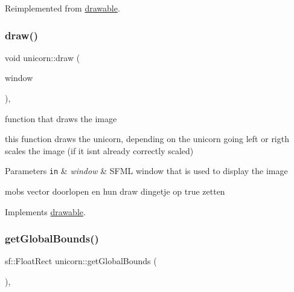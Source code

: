 Reimplemented from \hyperlink{classdrawable_abbc6e0089d502ba48c3fcb9c96e3966e}{drawable}.

\mbox{\label{classunicorn_a570c34d5669a8d2a61bdc1481e6f9dee}} 
\subsubsection{\texorpdfstring{draw()}{draw()}}
{\footnotesize\ttfamily void unicorn\+::draw (\begin{DoxyParamCaption}\item[{sf\+::\+Render\+Window \&}]{window }\end{DoxyParamCaption})\hspace{0.3cm}{\ttfamily [override]}, {\ttfamily [virtual]}}



function that draws the image 

this function draws the unicorn, depending on the unicorn going left or rigth scales the image (if it isn\textquotesingle{}t already correctly scaled)


\begin{DoxyParams}[1]{Parameters}
\mbox{\tt in}  & {\em window} & S\+F\+ML window that is used to display the image \\
\hline
\end{DoxyParams}
mobs vector doorlopen en hun draw dingetje op true zetten 

Implements \hyperlink{classdrawable_a4e49e2c1121704c83ce24c5f48dd910f}{drawable}.

\mbox{\label{classunicorn_a1bac09fc59b04f14f5a093bc4daa04da}} 
\subsubsection{\texorpdfstring{get\+Global\+Bounds()}{getGlobalBounds()}}
{\footnotesize\ttfamily sf\+::\+Float\+Rect unicorn\+::get\+Global\+Bounds (\begin{DoxyParamCaption}{ }\end{DoxyParamCaption})\hspace{0.3cm}{\ttfamily [override]}, {\ttfamily [virtual]}}



